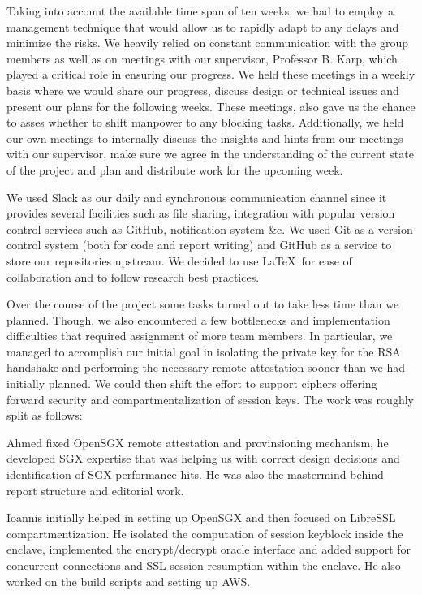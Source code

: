 \documentclass[../main.tex]{subfiles}
\begin{document}
Taking into account the available time span of ten weeks, we had to employ a
management technique that would allow us to rapidly adapt to any delays and
minimize the risks. We heavily relied on constant communication with the group
members as well as on meetings with our supervisor, Professor B. Karp, which
played a critical role in ensuring our progress. We held these meetings in a
weekly basis where we would share our progress, discuss design or technical
issues and present our plans for the following weeks. These meetings, also gave
us the chance to asses whether to shift manpower to any blocking tasks.
Additionally, we held our own meetings to internally discuss the insights and
hints from our meetings with our supervisor, make sure we agree in the
understanding of the current state of the project and plan and distribute work
for the upcoming week.

We used Slack as our daily and synchronous communication channel since it
provides several facilities such as file sharing, integration with popular
version control services such as GitHub, notification system \&c. We used
Git as a version control system (both for code and report writing) and GitHub
as a service to store our repositories upstream. We decided to use \LaTeX~for
ease of collaboration and to follow research best practices.

Over the course of the project some tasks turned out to take less time than we
planned. Though, we also encountered a few bottlenecks and implementation
difficulties that required assignment of more team members. In particular, we
managed to accomplish our initial goal in isolating the private key for the RSA
handshake and performing the necessary remote attestation sooner than we had
initially planned. We could then shift the effort to support ciphers offering
forward security and compartmentalization of session keys. The work was roughly
split as follows:

Ahmed fixed OpenSGX remote attestation and provinsioning mechanism, he
developed SGX expertise that was helping us with correct design decisions and
identification of SGX performance hits. He was also the mastermind behind
report structure and editorial work.

Ioannis initially helped in setting up OpenSGX and then focused on LibreSSL
compartmentization. He isolated the computation of session keyblock inside the
enclave, implemented the encrypt/decrypt oracle interface and added support
for concurrent connections and SSL session resumption within the enclave. He
also worked on the build scripts and setting up AWS.
\end{document}
